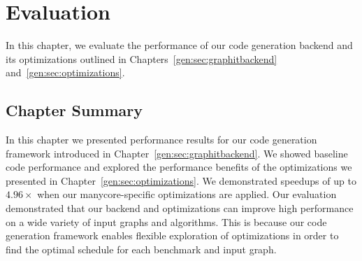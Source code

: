 \chapter{Evaluation}\label{sec:eval}

In this chapter, we evaluate the performance of our \graphit code generation backend and its optimizations outlined in Chapters~\ref{gen:sec:graphitbackend} and~\ref{gen:sec:optimizations}.




\section{Chapter Summary}

In this chapter we presented performance results for our code generation framework introduced in Chapter~\ref{gen:sec:graphitbackend}.
We showed baseline code performance and explored the performance benefits of the optimizations we presented in Chapter~\ref{gen:sec:optimizations}.
We demonstrated speedups of up to $4.96\times$ when our manycore-specific optimizations are applied.
Our evaluation demonstrated that our \graphit backend and optimizations can improve high performance on a wide variety of input graphs and algorithms.
This is because our code generation framework enables flexible exploration of optimizations in order to find the optimal schedule for each benchmark and input graph.